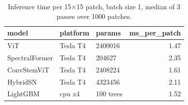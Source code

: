 \begin{table}
\caption{Inference time per 15×15 patch, batch size 1, median of 3 passes over 1000 patches.}
\label{tab:table_timing}
\begin{tabular}{lllr}
\toprule
model & platform & params & ms\_per\_patch \\
\midrule
ViT & Tesla T4 & 2400016 & 1.47 \\
SpectralFormer & Tesla T4 & 204627 & 2.35 \\
ConvStemViT & Tesla T4 & 2408224 & 1.61 \\
HybridSN & Tesla T4 & 4323456 & 2.11 \\
LightGBM & cpu x4 & 100 trees & 1.52 \\
\bottomrule
\end{tabular}
\end{table}
